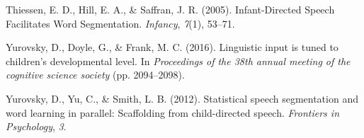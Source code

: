 \documentclass[10pt, letterpaper]{article}
\begin{document}
\hypertarget{ref-thiessen2005}{}
Thiessen, E. D., Hill, E. A., \& Saffran, J. R. (2005). Infant-Directed
Speech Facilitates Word Segmentation. \emph{Infancy}, \emph{7}(1),
53--71.

\hypertarget{ref-yurovsky2016}{}
Yurovsky, D., Doyle, G., \& Frank, M. C. (2016). Linguistic input is
tuned to children's developmental level. In \emph{Proceedings of the
38th annual meeting of the cognitive science society} (pp. 2094--2098).

\hypertarget{ref-yurovsky2012}{}
Yurovsky, D., Yu, C., \& Smith, L. B. (2012). Statistical speech
segmentation and word learning in parallel: Scaffolding from
child-directed speech. \emph{Frontiers in Psychology}, \emph{3}.


\end{document}
